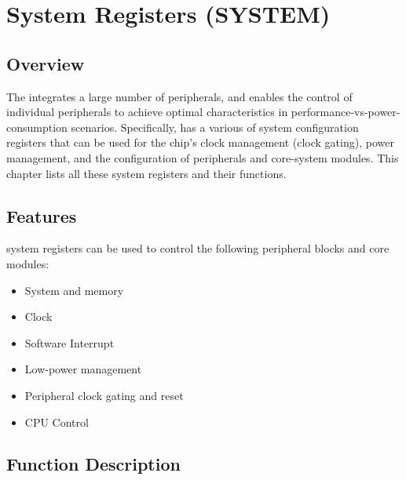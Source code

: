 \documentclass[main\_\_EN.tex]{subfiles}
\begin{document}

\ifglobal
\else
    {\let\clearpage\relax \listoftodos}
    \tableofcontents
\fi



\hypertarget{sysreg}{}
\chapter{System Registers (SYSTEM)}\label{mod:sysreg}

\section{Overview}

The \chipname{} integrates a large number of peripherals, and enables the control of individual peripherals to achieve optimal characteristics in performance-vs-power-consumption scenarios. Specifically, \chipname{} has a various of system configuration registers that can be used for the chip's clock management (clock gating), power management, and the configuration of peripherals and core-system modules. This chapter lists all these system registers and their functions.

\section{Features}

\chipname{} system registers can be used to control the following peripheral blocks and core modules:

\begin{itemize}
    \item System and memory
    \item Clock
    \item Software Interrupt
    \item Low-power management
    \item Peripheral clock gating and reset
    \item CPU Control
\end{itemize}


\section{Function Description}
\end{document}
